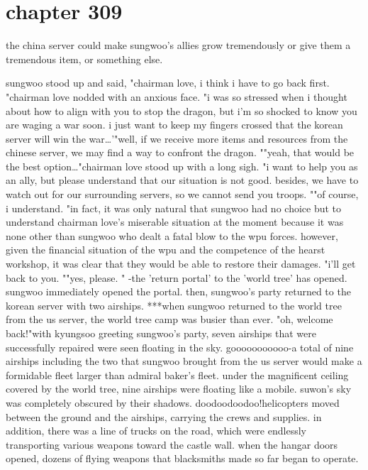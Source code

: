 \section{chapter 309}

the china server could make sungwoo's allies grow tremendously or give them a tremendous item, or something else.
 




sungwoo stood up and said, "chairman love, i think i have to go back first.
"chairman love nodded with an anxious face.
 "i was so stressed when i thought about how to align with you to stop the dragon, but i'm so shocked to know you are waging a war soon.
 i just want to keep my fingers crossed that the korean server will win the war…'"well, if we receive more items and resources from the chinese server, we may find a way to confront the dragon.
""yeah, that would be the best option…"chairman love stood up with a long sigh.
"i want to help you as an ally, but please understand that our situation is not good.
 besides, we have to watch out for our surrounding servers, so we cannot send you troops.
""of course, i understand.
"in fact, it was only natural that sungwoo had no choice but to understand chairman love's miserable situation at the moment because it was none other than sungwoo who dealt a fatal blow to the wpu forces.
 however, given the financial situation of the wpu and the competence of the hearst workshop, it was clear that they would be able to restore their damages.
"i'll get back to you.
""yes, please.
" 
-the 'return portal' to the 'world tree' has opened.
sungwoo immediately opened the portal.
 then, sungwoo's party returned to the korean server with two airships.
***when sungwoo returned to the world tree from the us server, the world tree camp was busier than ever.
"oh, welcome back!"with kyungsoo greeting sungwoo's party, seven airships that were successfully repaired were seen floating in the sky.
gooooooooooo-a total of nine airships including the two that sungwoo brought from the us server would make a formidable fleet larger than admiral baker's fleet.
 under the magnificent ceiling covered by the world tree, nine airships were floating like a mobile.
 suwon's sky was completely obscured by their shadows.
doodoodoodoo!helicopters moved between the ground and the airships, carrying the crews and supplies.
in addition, there was a line of trucks on the road, which were endlessly transporting various weapons toward the castle wall.
when the hangar doors opened, dozens of flying weapons that blacksmiths made so far began to operate.

